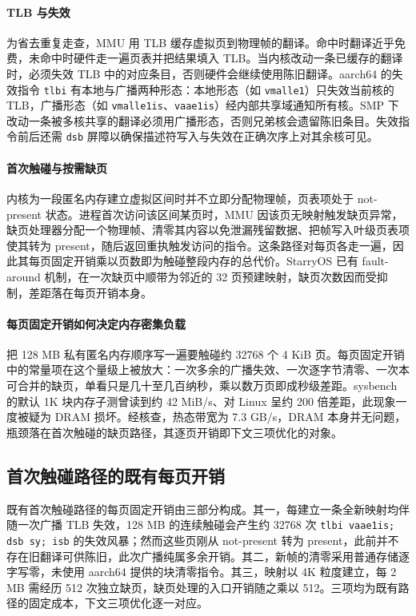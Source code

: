 \paragraph{TLB 与失效}
为省去重复走查，MMU 用 TLB 缓存虚拟页到物理帧的翻译。命中时翻译近乎免费，未命中时硬件走一遍页表并把结果填入 TLB。当内核改动一条已缓存的翻译时，必须失效 TLB 中的对应条目，否则硬件会继续使用陈旧翻译。aarch64 的失效指令 \texttt{tlbi} 有本地与广播两种形态：本地形态（如 \texttt{vmalle1}）只失效当前核的 TLB，广播形态（如 \texttt{vmalle1is}、\texttt{vaae1is}）经内部共享域通知所有核。SMP 下改动一条被多核共享的翻译必须用广播形态，否则兄弟核会遗留陈旧条目。失效指令前后还需 \texttt{dsb} 屏障以确保描述符写入与失效在正确次序上对其余核可见。

\paragraph{首次触碰与按需缺页}
内核为一段匿名内存建立虚拟区间时并不立即分配物理帧，页表项处于 not-present 状态。进程首次访问该区间某页时，MMU 因该页无映射触发缺页异常，缺页处理器分配一个物理帧、清零其内容以免泄漏残留数据、把帧写入叶级页表项使其转为 present，随后返回重执触发访问的指令。这条路径对每页各走一遍，因此其每页固定开销乘以页数即为触碰整段内存的总代价。StarryOS 已有 fault-around 机制，在一次缺页中顺带为邻近的 32 页预建映射，缺页次数因而受抑制，差距落在每页开销本身。

\paragraph{每页固定开销如何决定内存密集负载}
把 128 MB 私有匿名内存顺序写一遍要触碰约 32768 个 4 KiB 页。每页固定开销中的常量项在这个量级上被放大：一次多余的广播失效、一次逐字节清零、一次本可合并的缺页，单看只是几十至几百纳秒，乘以数万页即成秒级差距。sysbench 的默认 1K 块内存子测曾读到约 42 MiB/s、对 Linux 呈约 200 倍差距，此现象一度被疑为 DRAM 损坏。经核查，热态带宽为 7.3 GB/s，DRAM 本身并无问题，瓶颈落在首次触碰的缺页路径，其逐页开销即下文三项优化的对象。

\subsection{首次触碰路径的既有每页开销}

既有首次触碰路径的每页固定开销由三部分构成。其一，每建立一条全新映射均伴随一次广播 TLB 失效，128 MB 的连续触碰会产生约 32768 次 \texttt{tlbi vaae1is; dsb sy; isb} 的失效风暴；然而这些页刚从 not-present 转为 present，此前并不存在旧翻译可供陈旧，此次广播纯属多余开销。其二，新帧的清零采用普通存储逐字写零，未使用 aarch64 提供的块清零指令。其三，映射以 4K 粒度建立，每 2 MB 需经历 512 次独立缺页，缺页处理的入口开销随之乘以 512。三项均为既有路径的固定成本，下文三项优化逐一对应。

